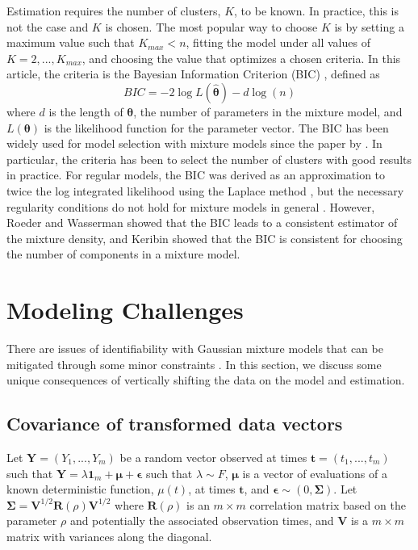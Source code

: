 \documentclass[12pt]{article}
\newcommand{\B}[0]{\mathbf}
\newcommand{\BS}[0]{\boldsymbol}
\begin{document}
Estimation requires the number of clusters, $K$, to be known. In practice, this is not the case and $K$ is chosen. The most popular way to choose $K$ is by setting a maximum value such that $K_{max}<n$, fitting the model under all values of $K=2,...,K_{max}$, and choosing the value that optimizes a chosen criteria. In this article, the criteria is the Bayesian Information Criterion (BIC) \cite{schwarz1978}, defined as
$$BIC = -2\log L(\hat{\BS\theta})- d\log(n)$$
where $d$ is the length of $\BS\theta$, the number of parameters in the mixture model, and $L(\BS\theta)$ is the likelihood function for the parameter vector. The BIC has been widely used for model selection with mixture models since the paper by \textcite{roeder1997}. In particular, the criteria has been to select the number of clusters \cite{dasgupta1999,fraley1999} with good results in practice. For regular models, the BIC was derived as an approximation to twice the log integrated likelihood using the Laplace method \cite{tierney1986}, but the necessary regularity conditions do not hold for mixture models in general \cite{aitkin1985}. However, Roeder and Wasserman \cite{roeder1997} showed that the BIC leads to a consistent estimator of the mixture density, and Keribin \cite{keribin2000} showed that the BIC is consistent for choosing the number of components in a mixture model.


\section{Modeling Challenges}
There are issues of identifiability with Gaussian mixture models that can be mitigated through some minor constraints \cite{mclachlan2000}. In this section, we discuss some unique consequences of vertically shifting the data on the model and estimation.

\subsection{Covariance of transformed data vectors}
Let $\B Y=(Y_{1},...,Y_{m})$ be a random vector observed at times $\B t=(t_{1},...,t_{m})$ such that
$\B Y = \lambda\B 1_{m} + \BS\mu + \BS\epsilon$
such that $\lambda\sim F$, $\BS\mu$ is a vector of evaluations of a known deterministic function, $\mu(t)$, at times $\B t$, and $\BS\epsilon\sim(0,\BS\Sigma)$. Let $\B\Sigma =\B V^{1/2}\B R(\rho)\B V^{1/2}$ where $\B R(\rho)$ is an $m\times m$ correlation matrix based on the parameter $\rho$ and potentially the associated observation times, and $\B V$ is a $m\times m$ matrix with variances along the diagonal. 
\end{document}

